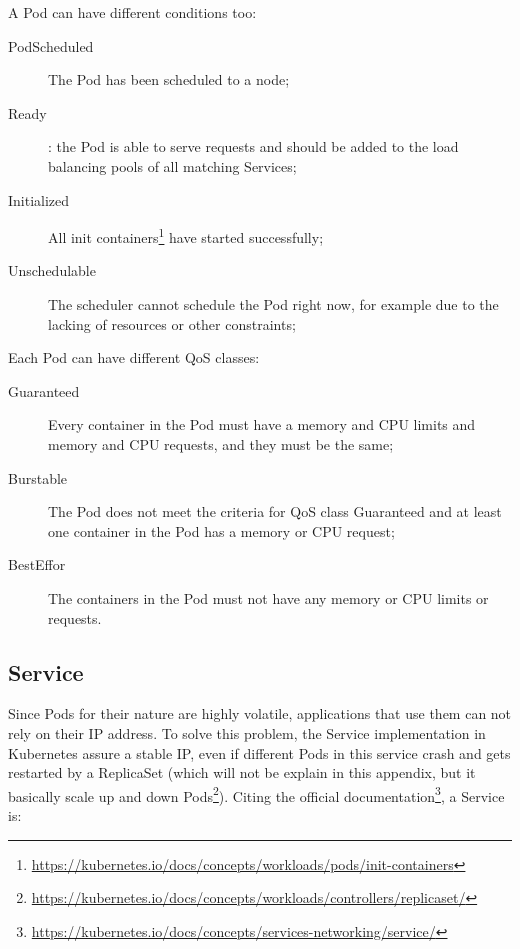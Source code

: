 A Pod can have different conditions too:

\begin{description}
\item[PodScheduled] The Pod has been scheduled to a node;
\item[Ready]: the Pod is able to serve requests and should be added
  to the load balancing pools of all matching Services;
\item[Initialized] All init containers\footnote{
  \url{https://kubernetes.io/docs/concepts/workloads/pods/init-containers}}
  have started successfully;
\item[Unschedulable] The scheduler cannot schedule the Pod right
  now, for example due to the lacking of resources or other constraints;
\end{description}

Each Pod can have different QoS classes:
\begin{description}
  \item [Guaranteed] Every container in the Pod must have a memory and CPU
  limits and memory and CPU requests, and they must be the same;
  \item [Burstable] The Pod does not meet the criteria for QoS class
  Guaranteed and at least one container in the Pod has a memory or CPU request;
  \item [BestEffor] The containers in the Pod must not have any memory or CPU
  limits or requests.
\end{description}

\subsection{Service}
\label{service}

Since Pods for their nature are highly volatile, applications that use them can
not rely on their IP address. To solve this problem, the Service implementation
in Kubernetes assure a stable IP, even if different Pods in this service crash
and gets restarted by a ReplicaSet (which will not be explain in this appendix,
but it basically scale up and down Pods\footnote{
  \url{https://kubernetes.io/docs/concepts/workloads/controllers/replicaset/}}).
Citing the official documentation\footnote{
\url{https://kubernetes.io/docs/concepts/services-networking/service/}}, a
Service is:\\


